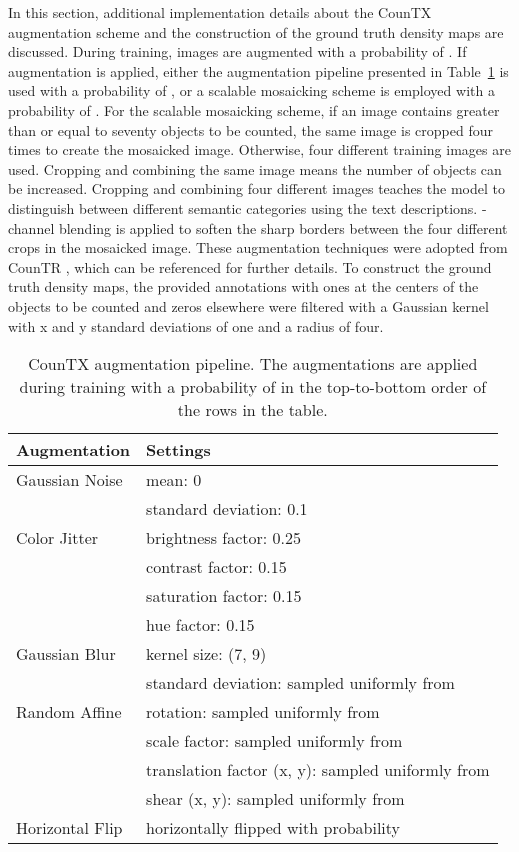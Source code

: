 \documentclass{bmvc2k}
\begin{document}
In this section, additional implementation details about the CounTX augmentation scheme and the construction of the ground truth density maps are discussed. During training, images are augmented with a probability of . If augmentation is applied, either the augmentation pipeline presented in Table~\ref{aug} is used with a probability of , or a scalable mosaicking scheme is employed with a probability of . For the scalable mosaicking scheme, if an image contains greater than or equal to seventy objects to be counted, the same image is cropped four times to create the mosaicked image. Otherwise, four different training images are used. Cropping and combining the same image means the number of objects can be increased. Cropping and combining four different images teaches the model to distinguish between different semantic categories using the text descriptions. -channel blending is applied to soften the sharp borders between the four different crops in the mosaicked image. These augmentation techniques were adopted from CounTR \cite{Liu2022CounTRTG}, which can be referenced for further details. To construct the ground truth density maps, the provided annotations with ones at the centers of the objects to be counted and zeros elsewhere were filtered with a Gaussian kernel with x and y standard deviations of one and a radius of four.
\begin{table}[h!]
\scriptsize
\centering
\begin{tabular}{|l|l|} 
  \hline
  \textbf{Augmentation} & \textbf{Settings} \\
   \hline
   Gaussian Noise & mean: 0\\ & standard deviation: 0.1 \\
   \hline
   Color Jitter & brightness factor: 0.25 \\ & contrast factor: 0.15 \\ & saturation factor: 0.15 \\ & hue factor: 0.15\\
  \hline
  Gaussian Blur & kernel size: (7, 9) \\ & standard deviation: sampled uniformly from \\
  \hline
  Random Affine & rotation: sampled uniformly from \\ & scale factor: sampled uniformly from \\ & translation factor (x, y): sampled uniformly from \\ & shear (x, y): sampled uniformly from \\
  \hline
  Horizontal Flip & horizontally flipped with probability \\
  \hline
 \end{tabular}
 \vspace{1mm}
 \caption{\label{aug} CounTX augmentation pipeline. The augmentations are applied during training with a probability of  in the top-to-bottom order of the rows in the table.}
 \end{table}
 
\end{document}
